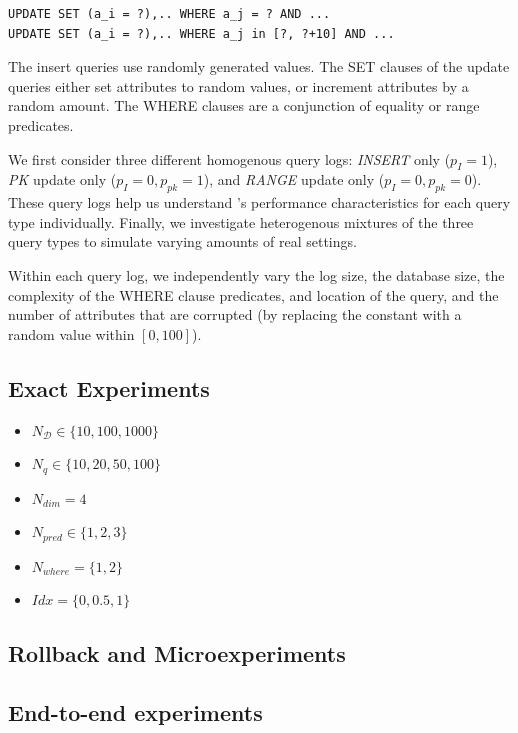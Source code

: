 {\scriptsize
\begin{verbatim}
UPDATE SET (a_i = ?),.. WHERE a_j = ? AND ...
UPDATE SET (a_i = ?),.. WHERE a_j in [?, ?+10] AND ...
\end{verbatim}
}

The insert queries use randomly generated values.  The SET clauses
of the update queries either set attributes to random values, or
increment attributes by a random amount.  The WHERE clauses are a
conjunction of equality or range predicates.

We first consider three different homogenous query logs: {\it INSERT} only ($p_I = 1$), 
{\it PK} update only ($p_I = 0, p_{pk} = 1$), and {\it RANGE} update only ($p_I = 0, p_{pk} = 0$).
These query logs help us understand \sys's performance characteristics for each query type individually.  
Finally, we investigate heterogenous mixtures of the three query types to simulate varying amounts of real settings.

Within each query log, we independently vary the log size, the
database size, the complexity of the WHERE clause predicates, and
location of the query, and the number of attributes that are corrupted
(by replacing the constant with a random value within $[0, 100]$).




\subsection{Exact Experiments}

\begin{itemize}
\item $N_\mathcal{D} \in \{10, 100, 1000\}$
\item $N_q \in \{10, 20, 50, 100\}$
\item $N_{dim} = 4$
\item $N_{pred} \in \{1, 2, 3\}$
\item $N_{where} = \{1, 2\}$
\item $Idx = \{0, 0.5, 1\}$
\end{itemize}

\subsection{Rollback and \qfix Microexperiments}

\subsection{End-to-end experiments}

